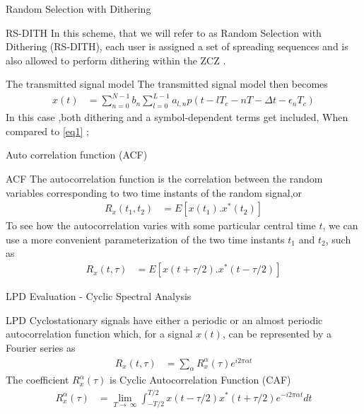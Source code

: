 \documentclass{beamer}
\begin{document}
\begin{frame}{Random Selection with Dithering}
\begin{block}{RS-DITH}
    In this scheme, that we will refer to as Random Selection with Dithering (RS-DITH), each user is assigned a set of spreading sequences and is also allowed to perform dithering within the ZCZ .
\end{block}
\begin{block}{The transmitted signal model}
   The transmitted signal model then becomes
\begin{align}
    x(t)& = \sum_{n = 0}^{N-1}b_{n}\sum_{l= 0}^{L-1}a_{l,n}p(t - lT_{c} -nT - \Delta t -\epsilon_{n} T_{c})
    \label{eq4}
\end{align}
   In this case ,both dithering and a symbol-dependent terms get included, When compared to \eqref{eq1} ;
\end{block}
\end{frame}
\begin{frame}{Auto correlation function (ACF)}
\begin{block}{ACF}
    The autocorrelation function is the correlation between the random variables corresponding to two time instants of the random signal,or
    \begin{align}
            R_{x}(t_{1},t_{2}) & = E[x(t_{1}).x^{*}(t_{2})]
    \end{align}
    To see how the autocorrelation varies with some particular central time $t$, we can use a more convenient parameterization of the two time instants $t_{1}$ and $t_{2}$, such as
    \begin{align}
    R_{x}(t,\tau) & = E[x(t + \tau/2).x^{*}(t - \tau/{2})]
    \end{align}
\end{block}
\end{frame}



\begin{frame}{LPD Evaluation - Cyclic Spectral Analysis}
\begin{block}{LPD }
    Cyclostationary signals have either a periodic or an almost periodic autocorrelation function which, for a signal $x(t)$, can be represented by a Fourier series as
\begin{align}
    R_{x}(t,\tau) & =\sum_{\alpha} R_{x}^{\alpha}(\tau)e^{i2\pi\alpha t}
    \label{eq5}
\end{align}
    The coefficient $R_{x}^{\alpha}(\tau)$ is Cyclic Autocorrelation Function (CAF)
\begin{align}
    R_{x}^{\alpha}(\tau) & =\lim_{T \to \ \infty} \int_{-T/2}^{T/2}x(t - \tau /2)x^{*}(t + \tau /2)e^{-i2\pi\alpha t} dt
    \label{eq6}
\end{align}
\end{block}
\end{frame}
\end{document}
